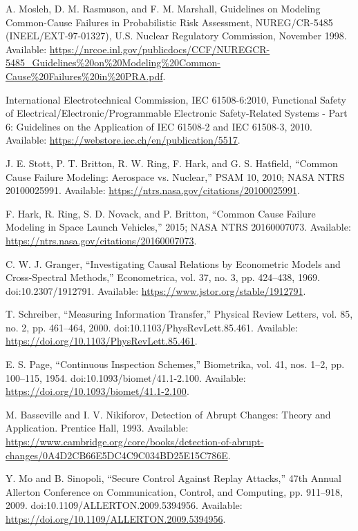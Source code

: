  A. Mosleh, D. M. Rasmuson, and F. M. Marshall, Guidelines on Modeling Common-Cause Failures in Probabilistic Risk Assessment, NUREG/CR-5485 (INEEL/EXT-97-01327), U.S. Nuclear Regulatory Commission, November 1998. Available: \url{https://nrcoe.inl.gov/publicdocs/CCF/NUREGCR-5485_Guidelines%20on%20Modeling%20Common-Cause%20Failures%20in%20PRA.pdf}.

 International Electrotechnical Commission, IEC 61508-6:2010, Functional Safety of Electrical/Electronic/Programmable Electronic Safety-Related Systems - Part 6: Guidelines on the Application of IEC 61508-2 and IEC 61508-3, 2010. Available: \url{https://webstore.iec.ch/en/publication/5517}.

 J. E. Stott, P. T. Britton, R. W. Ring, F. Hark, and G. S. Hatfield, ``Common Cause Failure Modeling: Aerospace vs. Nuclear,'' PSAM 10, 2010; NASA NTRS 20100025991. Available: \url{https://ntrs.nasa.gov/citations/20100025991}.

 F. Hark, R. Ring, S. D. Novack, and P. Britton, ``Common Cause Failure Modeling in Space Launch Vehicles,'' 2015; NASA NTRS 20160007073. Available: \url{https://ntrs.nasa.gov/citations/20160007073}.

 C. W. J. Granger, ``Investigating Causal Relations by Econometric Models and Cross-Spectral Methods,'' Econometrica, vol. 37, no. 3, pp. 424--438, 1969. doi:10.2307/1912791. Available: \url{https://www.jstor.org/stable/1912791}.

 T. Schreiber, ``Measuring Information Transfer,'' Physical Review Letters, vol. 85, no. 2, pp. 461--464, 2000. doi:10.1103/PhysRevLett.85.461. Available: \url{https://doi.org/10.1103/PhysRevLett.85.461}.

 E. S. Page, ``Continuous Inspection Schemes,'' Biometrika, vol. 41, nos. 1--2, pp. 100--115, 1954. doi:10.1093/biomet/41.1-2.100. Available: \url{https://doi.org/10.1093/biomet/41.1-2.100}.

 M. Basseville and I. V. Nikiforov, Detection of Abrupt Changes: Theory and Application. Prentice Hall, 1993. Available: \url{https://www.cambridge.org/core/books/detection-of-abrupt-changes/0A4D2CB66E5DC4C9C034BD25E15C786E}.

 Y. Mo and B. Sinopoli, ``Secure Control Against Replay Attacks,'' 47th Annual Allerton Conference on Communication, Control, and Computing, pp. 911--918, 2009. doi:10.1109/ALLERTON.2009.5394956. Available: \url{https://doi.org/10.1109/ALLERTON.2009.5394956}.

